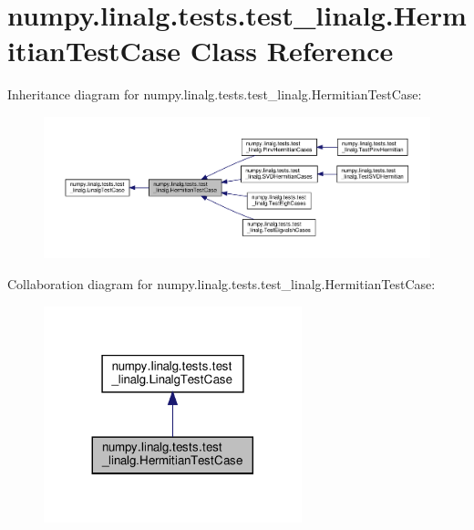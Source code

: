 \hypertarget{classnumpy_1_1linalg_1_1tests_1_1test__linalg_1_1HermitianTestCase}{}\section{numpy.\+linalg.\+tests.\+test\+\_\+linalg.\+Hermitian\+Test\+Case Class Reference}
\label{classnumpy_1_1linalg_1_1tests_1_1test__linalg_1_1HermitianTestCase}


Inheritance diagram for numpy.\+linalg.\+tests.\+test\+\_\+linalg.\+Hermitian\+Test\+Case\+:
\nopagebreak
\begin{figure}[H]
\begin{center}
\leavevmode
\includegraphics[width=350pt]{classnumpy_1_1linalg_1_1tests_1_1test__linalg_1_1HermitianTestCase__inherit__graph}
\end{center}
\end{figure}


Collaboration diagram for numpy.\+linalg.\+tests.\+test\+\_\+linalg.\+Hermitian\+Test\+Case\+:
\nopagebreak
\begin{figure}[H]
\begin{center}
\leavevmode
\includegraphics[width=212pt]{classnumpy_1_1linalg_1_1tests_1_1test__linalg_1_1HermitianTestCase__coll__graph}
\end{center}
\end{figure}
